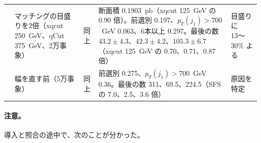 \documentclass[a4paper,10pt]{ltjsarticle}
\begin{document}
\begin{table}[htbp]
\begin{tabularx}{\linewidth}{>{\raggedright\arraybackslash}p{0.35cm}>{\raggedright\arraybackslash}p{2.9cm}>{\raggedright\arraybackslash}X>{\raggedright\arraybackslash}X>{\raggedright\arraybackslash}p{1.6cm}}
11 & マッチングの目盛りを2倍（xqcut 250~GeV、qCut 375~GeV、2万事象） & 同上 & 断面積 0.1903~pb（xqcut 125~GeV の 0.90 倍）。前選別 0.197、$p_T(j_1)>700$~GeV 0.063、6本以上 0.297。最後の数 $43.2\pm4.3$、$42.3\pm4.2$、$105.3\pm6.7$（xqcut 125~GeV の 0.70、0.71、0.87 倍） & 目盛りに 13〜30\% よる \\
12 & 幅を直す前（5万事象） & 同上 & 前選別 0.275、$p_T(j_1)>700$~GeV 0.36。最後の数 311、69.5、224.5（SFS の 7.0、2.5、3.6 倍） & 原因を特定 \\
\bottomrule
\end{tabularx}
\end{table}

\paragraph{注意。}導入と照合の途中で、次のことが分かった。
\end{document}
